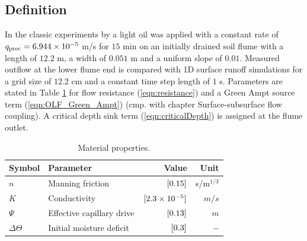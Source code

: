\subsection{Definition}
%
In the classic experiments by \cite{Smith:71} a light oil  
was applied with a constant rate of $q_{\mbox{\scriptsize prec}} =6.944\times 10^{-5}$ m/s for $15$ min  
on an initially drained soil flume with a length of $12.2$ m, a width of $0.051$ m and a uniform slope of $0.01$.
Measured outflow at the lower flume end is compared with 1D surface runoff simulations for a grid size of $12.2$ cm and a constant time step length of $1$ s.
Parameters are stated in Table \ref{tab-horton} for flow resistance (\ref{eqn:resistance}) and a Green Ampt source term (\ref{eqn:OLF_Green_Ampt}) 
(cmp. with chapter Surface-subsurface flow coupling).
A critical depth sink term (\ref{eqn:criticalDepth}) is assigned at the flume outlet.
%
\begin{table}[!htbp]
\caption{\label{tab-horton}Material properties.}
\begin{center}
\begin{tabular}{llrr}
\toprule
Symbol          & Parameter                 & Value                      & Unit \\
\midrule
$n$             & Manning friction 	        & $\, \mathrm{[}0.15]$              & s/m$^{1/3}$ \\
$K$             & Conductivity 	            & $\, \mathrm{[}2.3\times 10^{-5}]$ & $m/s$ \\
$\Psi$          & Effective capillary drive & $\, \mathrm{[}0.13]$              & $m$ \\
$\Delta \Theta$ & Initial moisture deficit  & $\, \mathrm{[}0.3]{}$             & $-$ \\
\bottomrule
\end{tabular}
\end{center}
\end{table}
%
